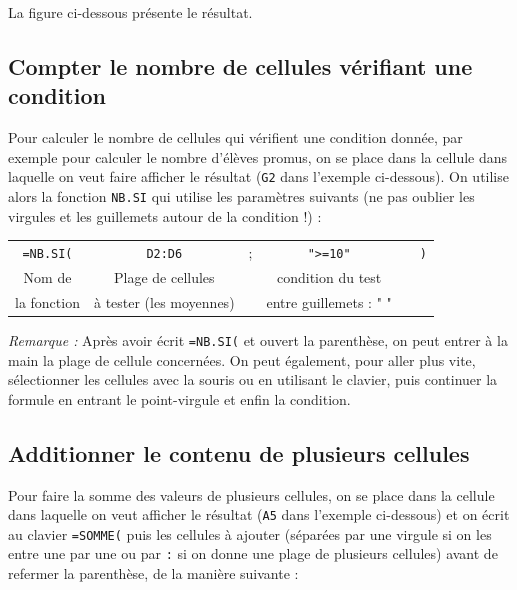 La figure ci-dessous présente le résultat.


\subsection{Compter le nombre de cellules vérifiant une condition}\label{Calc3NBSI}

Pour calculer le nombre de cellules qui vérifient une condition donnée, par exemple pour calculer le nombre d'élèves promus, on se place dans la cellule dans laquelle on veut faire afficher le résultat (\texttt{G2} dans l'exemple ci-dessous). On utilise alors la fonction \texttt{NB.SI} qui utilise les paramètres suivants (ne pas oublier les virgules et les guillemets autour de la condition !) :


\begin{center}
	\begin{tabular}{cccccc}
		\texttt{=NB.SI(} & \texttt{D2:D6} & ; & \texttt{">=10"} &  &  \texttt{)} \\  
		Nom de & Plage de cellules  & & condition du test &  & \\
		la fonction & à tester (les moyennes) & &  entre guillemets : " " & & \\  
	\end{tabular}
\end{center}



\emph{Remarque :} Après avoir écrit \texttt{=NB.SI(} et ouvert la parenthèse, on peut entrer à la main la plage de cellule concernées. On peut également, pour aller plus vite, sélectionner les cellules avec la souris ou en utilisant le clavier, puis continuer la formule en entrant le point-virgule et enfin la condition.



\subsection{Additionner le contenu de plusieurs cellules}\label{Calc3Somme}

Pour faire la somme des valeurs de plusieurs cellules, on se place dans la cellule dans laquelle on veut afficher le résultat (\texttt{A5} dans l'exemple ci-dessous) et on écrit au clavier \texttt{=SOMME(} puis les cellules à ajouter (séparées par une virgule si on les entre une par une ou par \texttt{:} si on donne une plage de plusieurs cellules) avant de refermer la parenthèse, de la manière suivante :

